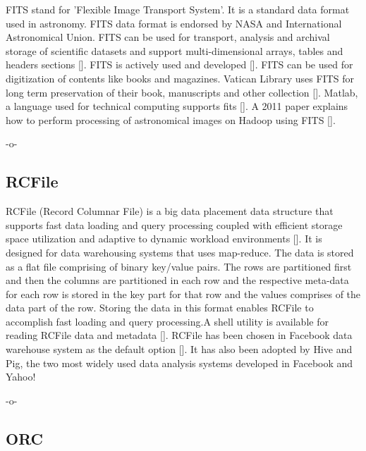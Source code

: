 FITS stand for 'Flexible Image Transport System'. It is a standard
data format used in astronomy. FITS data format is endorsed by NASA
and International Astronomical Union. FITS can be used for transport,
analysis and archival storage of scientific datasets and support
multi-dimensional arrays, tables and headers
sections [\cite{www-fits-nasa}].  FITS is actively used and
developed [\cite{www-news-fits-2016}].  FITS can be used for
digitization of contents like books and magazines. Vatican Library
uses FITS for long term preservation of their book, manuscripts and
other collection [\cite{www-fits-vatican-library}]. Matlab, a language
used for technical computing supports fits [\cite{www-fits-matlab}]. A
2011 paper explains how to perform processing of astronomical images
on Hadoop using FITS [\cite{paper-fits-2011}].

     -o-

\subsection{RCFile}

RCFile (Record Columnar File) is a big data placement data structure
that supports fast data loading and query processing coupled with
efficient storage space utilization and adaptive to dynamic workload
environments [\cite{www-rcfile-wiki}].  It is designed for data
warehousing systems that uses map-reduce. The data is stored as a flat
file comprising of binary key/value pairs. The rows are partitioned
first and then the columns are partitioned in each row and the
respective meta-data for each row is stored in the key part for that
row and the values comprises of the data part of the row. Storing the
data in this format enables RCFile to accomplish fast loading and
query processing.A shell utility is available for reading RCFile data
and metadata [\cite{www-rcfile-cat}]. RCFile has been chosen in Facebook
data warehouse system as the default option [\cite{he2011rcfile}]. It
has also been adopted by Hive and Pig, the two most widely used data
analysis systems developed in Facebook and Yahoo!

     -o-

\subsection{ORC}

